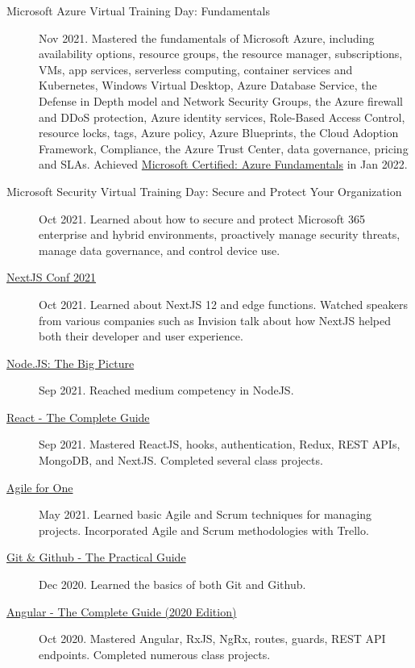 \documentclass{article}
\begin{document}
\begin{description}
  \item [Microsoft Azure Virtual Training Day: Fundamentals] Nov 2021. Mastered the fundamentals of Microsoft Azure, including availability options, resource groups, the resource manager, subscriptions, VMs, app services, serverless computing, container services and Kubernetes, Windows Virtual Desktop, Azure Database Service, the Defense in Depth model and Network Security Groups, the Azure firewall and DDoS protection, Azure identity services, Role-Based Access Control, resource locks, tags, Azure policy, Azure Blueprints, the Cloud Adoption Framework, Compliance, the Azure Trust Center, data governance, pricing and SLAs. Achieved \href{https://www.credly.com/badges/56339905-a587-4fdb-9906-c2d2bb5d31da/public_url}{Microsoft Certified: Azure Fundamentals} in Jan 2022.
  \item [Microsoft Security Virtual Training Day: Secure and Protect Your Organization] Oct 2021. Learned about how to secure and protect Microsoft 365 enterprise and hybrid environments, proactively manage security threats, manage data governance, and control device use.
  \item [\href{https://www.linkedin.com/posts/alexander-koik-cestone-89304556_alexander-koik-cestones-nextjs-conf-ticket-activity-6855242508260184065-xJP9/}{NextJS Conf 2021}] Oct 2021. Learned about NextJS 12 and edge functions. Watched speakers from various companies such as Invision talk about how NextJS helped both their developer and user experience.
  \item [\href{https://sirkoik.github.io/CurriculumVitae/certifications/Nodejs-The-Big-Picture/certificate.pdf}{Node.JS: The Big Picture}] Sep 2021. Reached medium competency in NodeJS.
  \item [\href{https://www.udemy.com/certificate/UC-2196f0cf-2dce-4a11-9d8e-421827506ad1/}{React - The Complete Guide}] Sep 2021. Mastered ReactJS, hooks, authentication, Redux, REST APIs, MongoDB, and NextJS. Completed several class projects.
  \item [\href{https://sirkoik.github.io/CurriculumVitae/certifications/Agile-for-One/certificate.pdf}{Agile for One}] May 2021. Learned basic Agile and Scrum techniques for managing projects. Incorporated Agile and Scrum methodologies with Trello.
  \item [\href{https://sirkoik.github.io/CurriculumVitae/certifications/certificate-of-completion-for-git-github-the-practical-guide.pdf}{Git \& Github - The Practical Guide}] Dec 2020. Learned the basics of both Git and Github.
  \item [\href{https://www.udemy.com/certificate/UC-624f6f83-940e-428f-accd-d16113661ded}{Angular - The Complete Guide (2020 Edition)}] Oct 2020. Mastered Angular, RxJS, NgRx, routes, guards, REST API endpoints. Completed numerous class projects.

\end{description}
\end{document}
